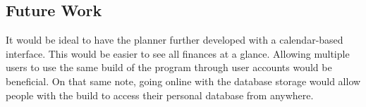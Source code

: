 \documentclass[10pt,conference,onecolumn,compsoc]{IEEEtran}
\begin{document}
\subsection{Future Work}
It would be ideal to have the planner further developed with a calendar-based interface. This would be easier to see all finances at a glance.
Allowing multiple users to use the same build of the program through user accounts would be beneficial.
On that same note, going online with the database storage would allow people with the build to access their personal database from anywhere.

\end{document}

